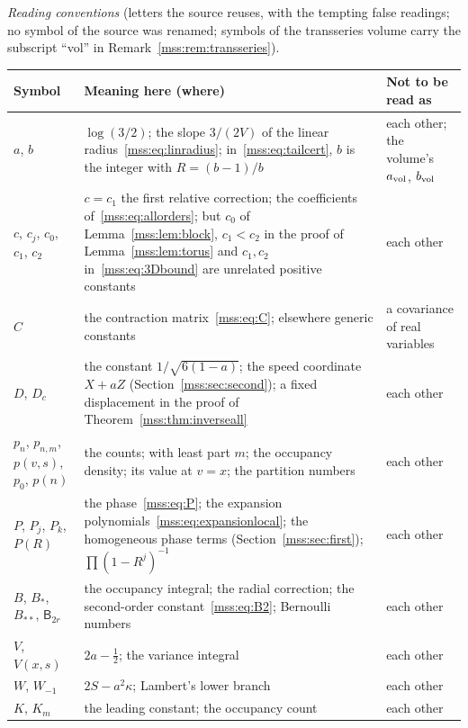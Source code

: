 \documentclass[11pt,letterpaper]{article}
\numberwithin{equation}{section}
\theoremstyle{definition}\newtheorem{definition}[theorem]{Definition}
\theoremstyle{remark}\newtheorem{remark}[theorem]{Remark}
\begin{document}
\medskip
\begingroup\small
\noindent\emph{Reading conventions} (letters the source reuses, with the
tempting false readings; no symbol of the source was renamed; symbols of the
transseries volume carry the subscript ``vol'' in
Remark~\ref{mss:rem:transseries}).\par\smallskip
\renewcommand{\arraystretch}{1.1}
\begin{longtable}{@{}>{\raggedright\arraybackslash}p{0.95in}>{\raggedright\arraybackslash}p{3.45in}>{\raggedright\arraybackslash}p{1.7in}@{}}
\toprule
Symbol & Meaning here (where) & Not to be read as\\
\midrule
\endhead
$a$, $b$ & $\log(3/2)$; the slope $3/(2V)$ of the linear radius~\eqref{mss:eq:linradius}; in~\eqref{mss:eq:tailcert}, $b$ is the integer with $R=(b-1)/b$ & each other; the volume's $a_{\rm vol}$, $b_{\rm vol}$\\
$c$, $c_j$, $c_0$, $c_1$, $c_2$ & $c=c_1$ the first relative correction; the coefficients of~\eqref{mss:eq:allorders}; but $c_0$ of Lemma~\ref{mss:lem:block}, $c_1<c_2$ in the proof of Lemma~\ref{mss:lem:torus} and $c_1,c_2$ in~\eqref{mss:eq:3Dbound} are unrelated positive constants & each other\\
$C$ & the contraction matrix~\eqref{mss:eq:C}; elsewhere generic constants & a covariance of real variables\\
$D$, $D_c$ & the constant $1/\sqrt{6(1-a)}$; the speed coordinate $X+aZ$ (Section~\ref{mss:sec:second}); a fixed displacement in the proof of Theorem~\ref{mss:thm:inverseall} & each other\\
$p_n$, $p_{n,m}$, $p(v,s)$, $p_0$, $p(n)$ & the counts; with least part $m$; the occupancy density; its value at $v=x$; the partition numbers & each other\\
$P$, $P_j$, $P_k$, $P(R)$ & the phase~\eqref{mss:eq:P}; the expansion polynomials~\eqref{mss:eq:expansionlocal}; the homogeneous phase terms (Section~\ref{mss:sec:first}); $\prod(1-R^j)^{-1}$ & each other\\
$B$, $B_*$, $B_{**}$, $\mathsf B_{2r}$ & the occupancy integral; the radial correction; the second-order constant~\eqref{mss:eq:B2}; Bernoulli numbers & each other\\
$V$, $V(x,s)$ & $2a-\tfrac12$; the variance integral & each other\\
$W$, $W_{-1}$ & $2S-a^2\kappa$; Lambert's lower branch & each other\\
$K$, $K_m$ & the leading constant; the occupancy count & each other\\

\end{longtable}
\end{document}
